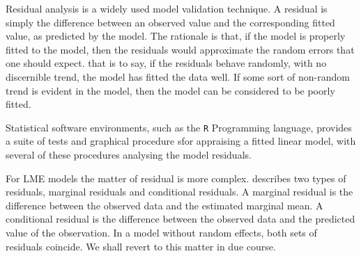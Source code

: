 \documentclass[12pt, a4paper]{report}
\theoremstyle{plain}
\theoremstyle{definition}
\theoremstyle{remark}
\begin{document}




Residual analysis is a widely used model validation technique. A residual is simply the difference between an observed value and the corresponding fitted value, as predicted by the model. The rationale is that, if the model is properly fitted to the model, then the residuals would approximate the random errors that one should expect.
that is to say, if the residuals behave randomly, with no discernible trend, the model has fitted the data well. If some sort of non-random trend is evident in the model, then the model can be considered to be poorly fitted.


Statistical software environments, such as the \texttt{R} Programming language, provides a suite of tests and graphical procedure sfor appraising a fitted linear model, with several 
of these procedures analysing the model residuals.

For LME models the matter of residual is more complex. \citet{schab} describes two types
of residuals, marginal residuals and conditional residuals. A marginal residual is the difference between the observed data and the estimated marginal mean. A conditional residual is the
difference between the observed data and the predicted value of
the observation. In a model without random effects, both sets of
residuals coincide. We shall revert to this matter in due course.
\end{document}

